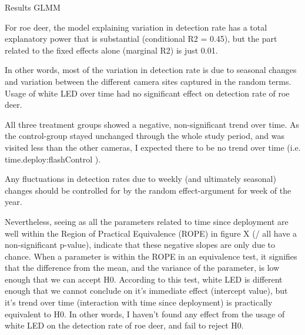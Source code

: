 Results
GLMM

For roe deer, the model explaining variation in detection rate has a total explanatory power that is substantial (conditional R2 = 0.45), but the part related to the fixed effects alone (marginal R2) is just 0.01.

In other words, most of the variation in detection rate is due to seasonal changes and variation between the different camera sites captured in the random terms.
Usage of white LED over time had no significant effect on detection rate of roe deer.

All three treatment groups showed a negative, non-significant trend over time.
As the control-group stayed unchanged through the whole study period, and was visited less than the other cameras, I expected there to be no trend over time (i.e. time.deploy:flashControl ).

Any fluctuations in detection rates due to weekly (and ultimately seasonal) changes should be controlled for by the random effect-argument for week of the year.

Nevertheless, seeing as all the parameters related to time since deployment are well within the Region of Practical Equivalence (ROPE)  in figure X (/ all have a non-significant p-value), indicate that these negative slopes are only due to chance. When a parameter is within the ROPE in an equivalence test, it signifies that the difference from the mean, and the variance of the parameter, is low enough that we can accept H0.
According to this test, white LED is different enough that we cannot conclude on it’s immediate effect (intercept value), but it’s trend over time (interaction with time since deployment) is practically equivalent to H0.
In other words, I haven't found any effect from the usage of white LED on the detection rate of roe deer, and fail to reject H0.
